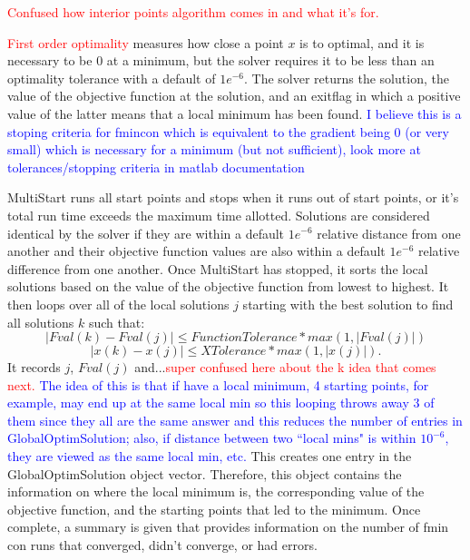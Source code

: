 \documentclass[12pt]{article}
\begin{document}
\textcolor{red}{Confused how interior points algorithm comes in and what it's for.}


\textcolor{red}{First order optimality} measures how close a point $x$ is to optimal, and it is necessary to be 0 at a minimum, but the solver requires it to be less than an optimality tolerance with a default of $1e^{-6}$. %
The solver returns the solution, the value of the objective function at the solution, and an exitflag in which a positive value of the latter means that a local minimum has been found. \textcolor{blue}{I believe this is a stoping criteria for fmincon which is equivalent to the gradient being 0 (or very small) which is necessary for a minimum (but not sufficient), look more at tolerances/stopping criteria in matlab documentation} %

MultiStart runs all start points and stops when it runs out of start points, or it's total run time exceeds the maximum time allotted. Solutions are considered identical by the solver if they are within a default $1e^{-6}$ relative distance from one another and their objective function values are also within a default $1e^{-6}$ relative difference from one another. %
Once MultiStart has stopped, it sorts the local solutions based on the value of the objective function from lowest to highest. It then loops over all of the local solutions $j$ starting with the best solution to find all solutions $k$ such that: \\ 
$$|Fval(k)-Fval(j)| \leq FunctionTolerance*max(1, |Fval(j)|)$$
$$|x(k)-x(j)| \leq XTolerance*max(1,|x(j)|).$$
It records $j$, $Fval(j)$ and...\textcolor{red}{super confused here about the k idea that comes next.} \textcolor{blue}{The idea of this is that if have a local minimum, 4 starting points, for example, may end up at the same local min so this looping throws away 3 of them since they all are the same answer and this reduces the number of entries in GlobalOptimSolution; also, if distance between two ``local mins" is within $10^{-6}$, they are viewed as the same local min, etc.}
This creates one entry in the GlobalOptimSolution object vector. %
Therefore, this object contains the information on where the local minimum is, the corresponding value of the objective function, and the starting points that led to the minimum. 
Once complete, a summary is given that provides information on the number of fmin con runs that converged, didn't converge, or had errors. %
\end{document}
